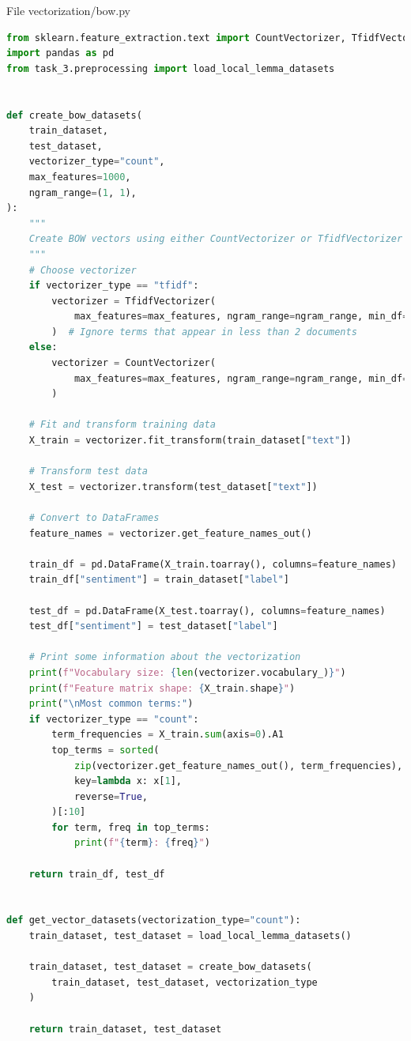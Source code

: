 \documentclass[12pt]{article}
\begin{document}
File vectorization/bow.py
\begin{lstlisting}[language=Python]
from sklearn.feature_extraction.text import CountVectorizer, TfidfVectorizer
import pandas as pd
from task_3.preprocessing import load_local_lemma_datasets


def create_bow_datasets(
    train_dataset,
    test_dataset,
    vectorizer_type="count",
    max_features=1000,
    ngram_range=(1, 1),
):
    """
    Create BOW vectors using either CountVectorizer or TfidfVectorizer
    """
    # Choose vectorizer
    if vectorizer_type == "tfidf":
        vectorizer = TfidfVectorizer(
            max_features=max_features, ngram_range=ngram_range, min_df=2
        )  # Ignore terms that appear in less than 2 documents
    else:
        vectorizer = CountVectorizer(
            max_features=max_features, ngram_range=ngram_range, min_df=2
        )

    # Fit and transform training data
    X_train = vectorizer.fit_transform(train_dataset["text"])

    # Transform test data
    X_test = vectorizer.transform(test_dataset["text"])

    # Convert to DataFrames
    feature_names = vectorizer.get_feature_names_out()

    train_df = pd.DataFrame(X_train.toarray(), columns=feature_names)
    train_df["sentiment"] = train_dataset["label"]

    test_df = pd.DataFrame(X_test.toarray(), columns=feature_names)
    test_df["sentiment"] = test_dataset["label"]

    # Print some information about the vectorization
    print(f"Vocabulary size: {len(vectorizer.vocabulary_)}")
    print(f"Feature matrix shape: {X_train.shape}")
    print("\nMost common terms:")
    if vectorizer_type == "count":
        term_frequencies = X_train.sum(axis=0).A1
        top_terms = sorted(
            zip(vectorizer.get_feature_names_out(), term_frequencies),
            key=lambda x: x[1],
            reverse=True,
        )[:10]
        for term, freq in top_terms:
            print(f"{term}: {freq}")

    return train_df, test_df


def get_vector_datasets(vectorization_type="count"):
    train_dataset, test_dataset = load_local_lemma_datasets()

    train_dataset, test_dataset = create_bow_datasets(
        train_dataset, test_dataset, vectorization_type
    )

    return train_dataset, test_dataset
\end{lstlisting}
\end{document}
